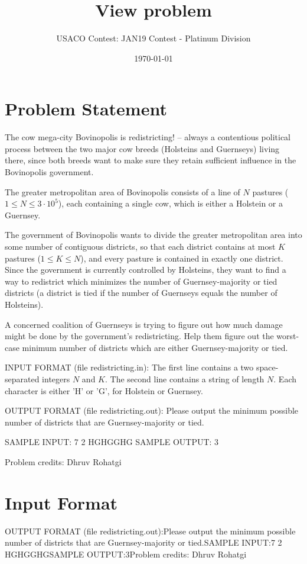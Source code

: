 \documentclass[12pt]{article}
\title{View problem}
\author{USACO Contest: JAN19 Contest - Platinum Division}
\date{\today}
\begin{document}
\maketitle

\section*{Problem Statement}

The cow mega-city Bovinopolis is redistricting! -- always a contentious 
political process between the two major cow breeds (Holsteins and Guernseys)
living there, since both breeds want to make sure they retain sufficient
influence in the Bovinopolis government.   

The greater metropolitan area of
Bovinopolis consists of a line of $N$ pastures ($1 \leq N \leq 3 \cdot 10^5$),
each containing a single cow, which is either a Holstein or a Guernsey.

The government of Bovinopolis wants to divide the greater metropolitan area into
some number of contiguous districts, so that each district contains at most $K$
pastures ($1 \leq K \leq N$), and every pasture is contained in exactly one
district. Since the government is currently controlled by Holsteins, they want
to find a way to redistrict which minimizes the number of Guernsey-majority or
tied districts (a district is tied if the number of Guernseys equals the number
of Holsteins).

A concerned coalition of Guernseys is trying to figure out how much damage might
be done by the government's redistricting. Help them figure out the worst-case
minimum number of districts which are either Guernsey-majority or tied.

INPUT FORMAT (file redistricting.in):
The first line contains a two space-separated integers $N$ and $K$. The second
line contains a string of length $N$. Each character is either 'H' or 'G', for
Holstein or Guernsey.

OUTPUT FORMAT (file redistricting.out):
Please output the minimum possible number of districts that are
Guernsey-majority or tied.

SAMPLE INPUT:
7 2
HGHGGHG
SAMPLE OUTPUT: 
3


Problem credits: Dhruv Rohatgi



\section*{Input Format}
OUTPUT FORMAT (file redistricting.out):Please output the minimum possible number of districts that are
Guernsey-majority or tied.SAMPLE INPUT:7 2
HGHGGHGSAMPLE OUTPUT:3Problem credits: Dhruv Rohatgi
\end{document}
